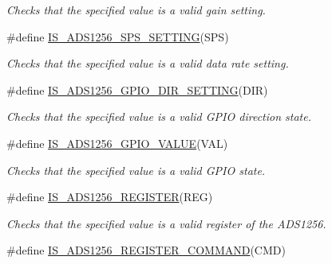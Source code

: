 \begin{DoxyCompactItemize}
\begin{DoxyCompactList}\small\item\em Checks that the specified value is a valid gain setting. \end{DoxyCompactList}\item 
\hypertarget{group__ads1256__driver_gabe0b1d880e2de683730c16b5e90464b2}{\#define \hyperlink{group__ads1256__driver_gabe0b1d880e2de683730c16b5e90464b2}{I\-S\-\_\-\-A\-D\-S1256\-\_\-\-S\-P\-S\-\_\-\-S\-E\-T\-T\-I\-N\-G}(S\-P\-S)}\label{group__ads1256__driver_gabe0b1d880e2de683730c16b5e90464b2}

\begin{DoxyCompactList}\small\item\em Checks that the specified value is a valid data rate setting. \end{DoxyCompactList}\item 
\hypertarget{group__ads1256__driver_ga06f377fb5b5b3d2ab93060ec6c9e3c61}{\#define \hyperlink{group__ads1256__driver_ga06f377fb5b5b3d2ab93060ec6c9e3c61}{I\-S\-\_\-\-A\-D\-S1256\-\_\-\-G\-P\-I\-O\-\_\-\-D\-I\-R\-\_\-\-S\-E\-T\-T\-I\-N\-G}(D\-I\-R)}\label{group__ads1256__driver_ga06f377fb5b5b3d2ab93060ec6c9e3c61}

\begin{DoxyCompactList}\small\item\em Checks that the specified value is a valid G\-P\-I\-O direction state. \end{DoxyCompactList}\item 
\hypertarget{group__ads1256__driver_ga020698e4651ad6159ff7805f0a933562}{\#define \hyperlink{group__ads1256__driver_ga020698e4651ad6159ff7805f0a933562}{I\-S\-\_\-\-A\-D\-S1256\-\_\-\-G\-P\-I\-O\-\_\-\-V\-A\-L\-U\-E}(V\-A\-L)}\label{group__ads1256__driver_ga020698e4651ad6159ff7805f0a933562}

\begin{DoxyCompactList}\small\item\em Checks that the specified value is a valid G\-P\-I\-O state. \end{DoxyCompactList}\item 
\hypertarget{group__ads1256__driver_gaebc1a1a44c11e1f5ee2281f10e7577f7}{\#define \hyperlink{group__ads1256__driver_gaebc1a1a44c11e1f5ee2281f10e7577f7}{I\-S\-\_\-\-A\-D\-S1256\-\_\-\-R\-E\-G\-I\-S\-T\-E\-R}(R\-E\-G)}\label{group__ads1256__driver_gaebc1a1a44c11e1f5ee2281f10e7577f7}

\begin{DoxyCompactList}\small\item\em Checks that the specified value is a valid register of the A\-D\-S1256. \end{DoxyCompactList}\item 
\hypertarget{group__ads1256__driver_ga55a9f5e79ef35937961a7ec254558010}{\#define \hyperlink{group__ads1256__driver_ga55a9f5e79ef35937961a7ec254558010}{I\-S\-\_\-\-A\-D\-S1256\-\_\-\-R\-E\-G\-I\-S\-T\-E\-R\-\_\-\-C\-O\-M\-M\-A\-N\-D}(C\-M\-D)}\label{group__ads1256__driver_ga55a9f5e79ef35937961a7ec254558010}


\end{DoxyCompactItemize}
